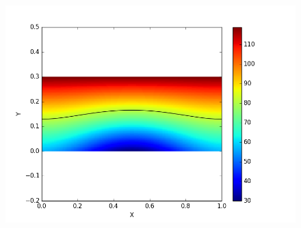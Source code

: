 \documentclass{article}
\begin{document}
\begin{figure}[!htb]
\includegraphics[scale=0.5]{solution157plot.png}
\label{fig:plot2}
\end{figure}



\end{document}
